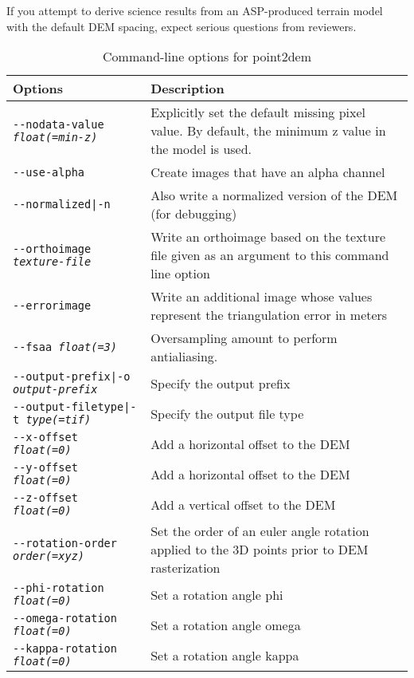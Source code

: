 If you attempt to derive science results from an ASP-produced terrain model 
with the default DEM spacing, expect serious questions from reviewers.


\begin{longtable}{|l|p{10cm}|}
\caption{Command-line options for point2dem}
\label{tbl:point2dem}
\endfirsthead
\endhead
\endfoot
\endlastfoot
\hline
Options & Description \\ \hline \hline
\texttt{-\/-nodata-value \textit{float(=min-z)}} & Explicitly set the default missing pixel value. By default, the minimum z value in the model is used. \\ \hline
\texttt{-\/-use-alpha} & Create images that have an alpha channel \\ \hline
\texttt{-\/-normalized|-n} & Also write a normalized version of the \ac{DEM} (for debugging) \\ \hline
\texttt{-\/-orthoimage \textit{texture-file}} & Write an orthoimage based on the texture file given as an argument to this command line option \\ \hline
\texttt{-\/-errorimage} & Write an additional image whose values represent the triangulation error in meters \\ \hline
\texttt{-\/-fsaa  \textit{float(=3)}} & Oversampling amount to perform antialiasing. \\ \hline
\texttt{-\/-output-prefix|-o \textit{output-prefix}} & Specify the output prefix \\ \hline
\texttt{-\/-output-filetype|-t \textit{type(=tif)}} & Specify the output file type \\ \hline
\hline
\texttt{-\/-x-offset \textit{float(=0)}} & Add a horizontal offset to the \ac{DEM} \\ \hline
\texttt{-\/-y-offset \textit{float(=0)}} & Add a horizontal offset to the \ac{DEM} \\ \hline
\texttt{-\/-z-offset \textit{float(=0)}} & Add a vertical offset to the \ac{DEM} \\ \hline
\texttt{-\/-rotation-order \textit{order(=xyz)}} & Set the order of an euler angle rotation applied to the 3D points prior to \ac{DEM} rasterization \\ \hline
\texttt{-\/-phi-rotation \textit{float(=0)}} & Set a rotation angle phi \\ \hline
\texttt{-\/-omega-rotation \textit{float(=0)}} & Set a rotation angle omega \\ \hline
\texttt{-\/-kappa-rotation \textit{float(=0)}} & Set a rotation angle kappa \\ \hline

\end{longtable}
